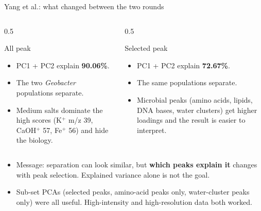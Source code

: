 \documentclass[aspectratio=169,10pt]{beamer}
\newcommand{\hl}[1]{{\color{warm}\bfseries #1}}
\begin{document}
\begin{frame}{Yang et al.: what changed between the two rounds}
  \begin{columns}[T]
    \begin{column}{0.5\textwidth}
      \begin{block}{All peak}
        \begin{itemize}\setlength\itemsep{1mm}
          \item PC1 + PC2 explain \hl{90.06\%}.
          \item The two \emph{Geobacter} populations separate.
          \item Medium salts dominate the high scores (K$^+$ m/z 39, CaOH$^+$ 57, Fe$^+$ 56) and hide the biology.
        \end{itemize}
      \end{block}
    \end{column}
    \begin{column}{0.5\textwidth}
      \begin{block}{Selected peak}
        \begin{itemize}\setlength\itemsep{1mm}
          \item PC1 + PC2 explain \hl{72.67\%}.
          \item The same populations separate.
          \item Microbial peaks (amino acids, lipids, DNA bases, water clusters) get higher loadings and the result is easier to interpret.
        \end{itemize}
      \end{block}
    \end{column}
  \end{columns}
  \vspace{3mm}
  \begin{itemize}\setlength\itemsep{2mm}
    \item Message: separation can look similar, but \hl{which peaks explain it} changes with peak selection. Explained variance alone is not the goal.
    \item Sub-set PCAs (selected peaks, amino-acid peaks only, water-cluster peaks only) were all useful. High-intensity and high-resolution data both worked.
  \end{itemize}
\end{frame}
\end{document}
